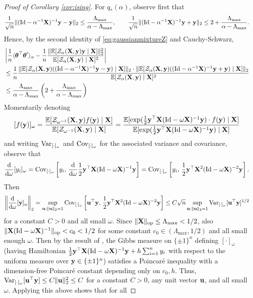 \begin{proof}[Proof of Corollary \ref{cor:ising}]
For $q_*(\alpha)$, observe first
that
\[\frac{1}{\sqrt{n}}\|(\mathrm{Id}-\alpha^{-1}\mathbf{X})^{-1}\mathbf{y}-\mathbf{y}\|_2
\leq \frac{\Lambda_{\max}}{\alpha-\Lambda_{\max}},
\qquad
\frac{1}{\sqrt{n}}\|(\mathrm{Id}-\alpha^{-1}\mathbf{X})^{-1}\mathbf{y}+\mathbf{y}\|_2
\leq 2+\frac{\Lambda_{\max}}{\alpha-\Lambda_{\max}}.\]
Hence, by the second identity of \eqref{eq:gaussianmixtureZ} and Cauchy-Schwarz,
\begin{align}
&\left|\frac{1}{n}\langle \boldsymbol{\theta}^\top\boldsymbol{\theta}'\rangle_\alpha
-\frac{1}{n}\frac{\|\mathbb{E}[\mathcal{Z}_\alpha(\mathbf{X},\mathbf{y})\mathbf{y} \mid \mathbf{X}]\|_2^2}
{\mathbb{E}[\mathcal{Z}_\alpha(\mathbf{X},\mathbf{y}) \mid \mathbf{X}]^2}\right|\notag\\
&\leq \frac{1}{n}\frac{\|\mathbb{E}[\mathcal{Z}_\alpha(\mathbf{X},\mathbf{y})((\mathrm{Id}-\alpha^{-1}\mathbf{X})^{-1}\mathbf{y}-\mathbf{y}) \mid
\mathbf{X}]\|_2 \cdot \|\mathbb{E}[\mathcal{Z}_\alpha(\mathbf{X},\mathbf{y})((\mathrm{Id}-\alpha^{-1}\mathbf{X})^{-1}\mathbf{y}+\mathbf{y}) \mid
\mathbf{X}]\|_2}{\mathbb{E}[\mathcal{Z}_\alpha(\mathbf{X},\mathbf{y}) \mid \mathbf{X}]^2}\notag\\
&\leq \frac{\Lambda_{\max}}{\alpha-\Lambda_{\max}}
\left(2+\frac{\Lambda_{\max}}{\alpha-\Lambda_{\max}}\right)\label{eq:overlapcompare}
\end{align}
Momentarily denoting
\[[f(\mathbf{y})]_\omega
=\frac{\mathbb{E}[\mathcal{Z}_{\omega^{-1}}(\mathbf{X},\mathbf{y})f(\mathbf{y}) \mid \mathbf{X}]}{\mathbb{E}[\mathcal{Z}_{\omega^{-1}}(\mathbf{X},\mathbf{y}) \mid \mathbf{X}]}
=\frac{\mathbb{E}[\exp(\frac{1}{2}\mathbf{y}^\top\mathbf{X}(\mathrm{Id}-\omega \mathbf{X})^{-1}\mathbf{y}) \cdot f(\mathbf{y}) \mid
\mathbf{X}]}{\mathbb{E}[\exp(\frac{1}{2}\mathbf{y}^\top\mathbf{X}(\mathrm{Id}-\omega \mathbf{X})^{-1}\mathbf{y}) \mid \mathbf{X}]}\]
and writing $\operatorname{Var}_{[\cdot]_\omega}$ and
$\operatorname{Cov}_{[\cdot]_\omega}$ for the associated variance and covariance, observe that
\[\frac{\mathrm{d}}{\mathrm{d}\omega}[y_i]_\omega
=\operatorname{Cov}_{[\cdot]_\omega}\left[y_i,\,\frac{\mathrm{d}}{\mathrm{d}\omega}\frac{1}{2}\mathbf{y}^\top\mathbf{X}(\mathrm{Id}-\omega\mathbf{X})^{-1}\mathbf{y}\right]
=\operatorname{Cov}_{[\cdot]_\omega}\left[y_i,\,\frac{1}{2}\mathbf{y}^\top\mathbf{X}^2(\mathrm{Id}-\omega\mathbf{X})^{-2}\mathbf{y}\right].\]
Then
\[\left\|\frac{\mathrm{d}}{\mathrm{d} \omega}[\mathbf{y}]_\omega\right\|_2
=\sup_{\mathbf{u}:\|\mathbf{u}\|_2=1} \operatorname{Cov}_{[\cdot]_\omega}\left[\mathbf{u}^\top\mathbf{y},
\,\frac{1}{2}\mathbf{y}^\top\mathbf{X}^2(\mathrm{Id}-\omega\mathbf{X})^{-2}\mathbf{y}\right]
\leq C\sqrt{n}\sup_{\mathbf{u}:\|\mathbf{u}\|_2=1} \operatorname{Var}_{[\cdot]_\omega}[\mathbf{u}^\top\mathbf{y}]^{1/2}\]
for a constant $C>0$ and all small $\omega$. Since $\|\mathbf{X}\|_{\mathrm{op}} \leq
\Lambda_{\max}<1/2$, also
$\|\mathbf{X}(\mathrm{Id}-\omega \mathbf{X})^{-1}\|_{\mathrm{op}}<c_0<1/2$ for some constant
$c_0 \in (\Lambda_{\max},1/2)$ and all small enough $\omega$. Then by the result
of \cite{bauerschmidt2019very}, the Gibbs measure on $\{\pm 1\}^n$ defining
$[\cdot]_\omega$ (having Hamiltonian $\frac{1}{2}\mathbf{y}^\top \mathbf{X}(\mathrm{Id}-\omega
\mathbf{X})^{-1}\mathbf{y}+h\sum_{i=1}^n y_i$ with respect to the uniform measure over
$\mathbf{y} \in \{\pm 1\}^n$)
satisfies a Poincar\'e inequality with a dimension-free
Poincar\'e constant depending only on $c_0,h$. Thus,
$\operatorname{Var}_{[\cdot]_\omega}[\mathbf{u}^\top\mathbf{y}] \leq C\|\mathbf{u}\|_2^2 \leq C$ for a constant $C>0$, any unit vector $\mathbf{u}$,
and all small $\omega$. Applying this above shows that for all

\end{proof}
